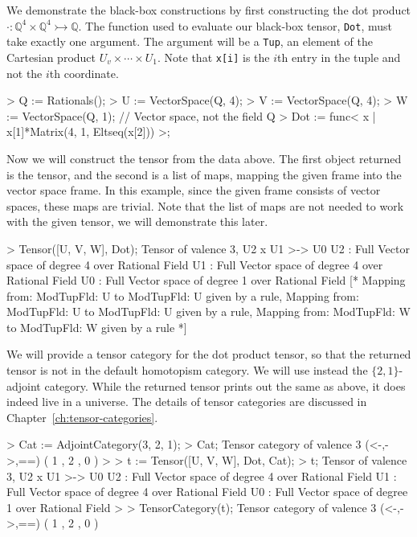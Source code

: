 \documentclass{documentation}
\begin{document}
\begin{example}[BBTensorsFrame]
We demonstrate the black-box constructions by first constructing the dot product $\cdot : \mathbb{Q}^4\times \mathbb{Q}^4\rightarrowtail \mathbb{Q}$.
The function used to evaluate our black-box tensor, \texttt{Dot}, must take exactly one argument.
The argument will be a \texttt{Tup}, an element of the Cartesian product $U_{v}\times \cdots\times U_1$.
Note that \texttt{x[i]} is the $i$th entry in the tuple and not the $i$th coordinate.
\begin{code}
> Q := Rationals();
> U := VectorSpace(Q, 4);
> V := VectorSpace(Q, 4);
> W := VectorSpace(Q, 1);  // Vector space, not the field Q
> Dot := func< x | x[1]*Matrix(4, 1, Eltseq(x[2])) >;
\end{code}

Now we will construct the tensor from the data above.
The first object returned is the tensor, and the second is a list of maps, mapping the given frame into the vector space frame.
In this example, since the given frame consists of vector spaces, these maps are trivial.
Note that the list of maps are not needed to work with the given tensor, we will demonstrate this later. 
\begin{code}
> Tensor([U, V, W], Dot);
Tensor of valence 3, U2 x U1 >-> U0
U2 : Full Vector space of degree 4 over Rational Field
U1 : Full Vector space of degree 4 over Rational Field
U0 : Full Vector space of degree 1 over Rational Field
[*
    Mapping from: ModTupFld: U to ModTupFld: U given by a rule,
    Mapping from: ModTupFld: U to ModTupFld: U given by a rule,
    Mapping from: ModTupFld: W to ModTupFld: W given by a rule
*]
\end{code}

We will provide a tensor category for the dot product tensor, so that the returned tensor is not in the default homotopism category. 
We will use instead the $\{2,1\}$-adjoint category.
While the returned tensor prints out the same as above, it does indeed live in a universe.
The details of tensor categories are discussed in Chapter~\ref{ch:tensor-categories}.
\begin{code}
> Cat := AdjointCategory(3, 2, 1);
> Cat;
Tensor category of valence 3 (<-,->,==) ({ 1 },{ 2 },{ 0 })
> 
> t := Tensor([U, V, W], Dot, Cat);
> t;
Tensor of valence 3, U2 x U1 >-> U0
U2 : Full Vector space of degree 4 over Rational Field
U1 : Full Vector space of degree 4 over Rational Field
U0 : Full Vector space of degree 1 over Rational Field
> 
> TensorCategory(t);
Tensor category of valence 3 (<-,->,==) ({ 1 },{ 2 },{ 0 })
\end{code}
\end{example}
\end{document}
